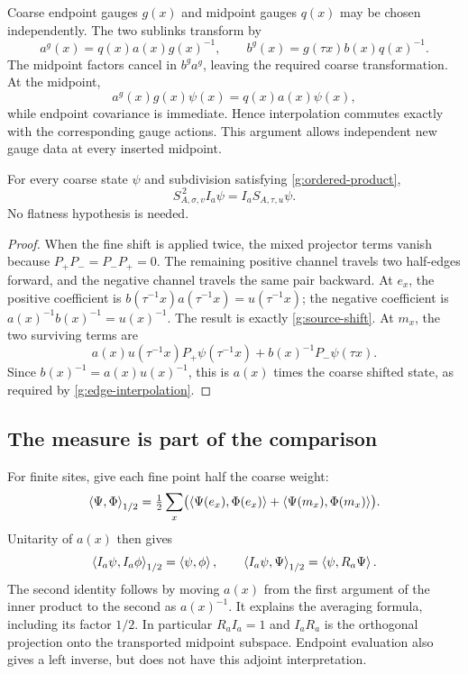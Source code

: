 Coarse endpoint gauges $g(x)$ and midpoint gauges $q(x)$ may be chosen independently. The two sublinks transform by
\[
 a^g(x)=q(x)a(x)g(x)^{-1},\qquad
 b^g(x)=g(\tau x)b(x)q(x)^{-1}.
\]
The midpoint factors cancel in $b^ga^g$, leaving the required coarse transformation. At the midpoint,
\[
 a^g(x)g(x)\psi(x)=q(x)a(x)\psi(x),
\]
while endpoint covariance is immediate. Hence interpolation commutes exactly with the corresponding gauge actions. This argument allows independent new gauge data at every inserted midpoint.

\begin{theorem}
For every coarse state $\psi$ and subdivision satisfying \eqref{g:ordered-product},
\begin{equation}
 S_{A,\sigma,v}^{\,2}I_a\psi=I_aS_{A,\tau,u}\psi.
 \label{g:half-intertwining}
\end{equation}
No flatness hypothesis is needed.
\end{theorem}
\begin{proof}
When the fine shift is applied twice, the mixed projector terms vanish because $P_+P_-=P_-P_+=0$. The remaining positive channel travels two half-edges forward, and the negative channel travels the same pair backward. At $e_x$, the positive coefficient is $b(\tau^{-1}x)a(\tau^{-1}x)=u(\tau^{-1}x)$; the negative coefficient is $a(x)^{-1}b(x)^{-1}=u(x)^{-1}$. The result is exactly \eqref{g:source-shift}. At $m_x$, the two surviving terms are
\[
 a(x)u(\tau^{-1}x)P_+\psi(\tau^{-1}x)
   +b(x)^{-1}P_-\psi(\tau x).
\]
Since $b(x)^{-1}=a(x)u(x)^{-1}$, this is $a(x)$ times the coarse shifted state, as required by \eqref{g:edge-interpolation}.
\end{proof}

\subsection{The measure is part of the comparison}
For finite sites, give each fine point half the coarse weight:
\[
 \left\langle\Psi,\Phi\right\rangle_{1/2}
 =\tfrac12\sum_x\bigl(
    \left\langle\Psi(e_x),\Phi(e_x)\right\rangle
   +\left\langle\Psi(m_x),\Phi(m_x)\right\rangle\bigr).
\]
Unitarity of $a(x)$ then gives
\begin{equation}
 \left\langle I_a\psi,I_a\phi\right\rangle_{1/2}=\left\langle\psi,\phi\right\rangle,
 \qquad
 \left\langle I_a\psi,\Psi\right\rangle_{1/2}=\left\langle\psi,R_a\Psi\right\rangle.
 \label{g:edge-adjoint}
\end{equation}
The second identity follows by moving $a(x)$ from the first argument of the inner product to the second as $a(x)^{-1}$. It explains the averaging formula, including its factor $1/2$. In particular $R_aI_a=1$ and $I_aR_a$ is the orthogonal projection onto the transported midpoint subspace. Endpoint evaluation also gives a left inverse, but does not have this adjoint interpretation.

